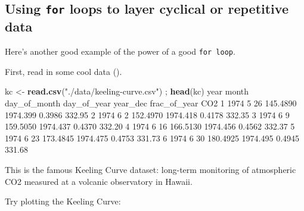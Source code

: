 \documentclass[
]{book}
\newenvironment{Shaded}{\begin{snugshade}}{\end{snugshade}}
\newcommand{\DataTypeTok}[1]{\textcolor[rgb]{0.13,0.29,0.53}{#1}}
\newcommand{\DecValTok}[1]{\textcolor[rgb]{0.00,0.00,0.81}{#1}}
\newcommand{\FloatTok}[1]{\textcolor[rgb]{0.00,0.00,0.81}{#1}}
\newcommand{\KeywordTok}[1]{\textcolor[rgb]{0.13,0.29,0.53}{\textbf{#1}}}
\newcommand{\NormalTok}[1]{#1}
\newcommand{\OperatorTok}[1]{\textcolor[rgb]{0.81,0.36,0.00}{\textbf{#1}}}
\newcommand{\StringTok}[1]{\textcolor[rgb]{0.31,0.60,0.02}{#1}}
\begin{document}
\hypertarget{using-for-loops-to-layer-cyclical-or-repetitive-data}{%
\subsection*{\texorpdfstring{Using \texttt{for} loops to layer cyclical or repetitive data}{Using for loops to layer cyclical or repetitive data}}\label{using-for-loops-to-layer-cyclical-or-repetitive-data}}

Here's another good example of the power of a good \texttt{for\ loop}.

First, read in some cool data ().

\begin{Shaded}
\begin{Highlighting}[]
\NormalTok{kc <-}\StringTok{ }\KeywordTok{read.csv}\NormalTok{(}\StringTok{"./data/keeling-curve.csv"}\NormalTok{) ; }\KeywordTok{head}\NormalTok{(kc)}
\NormalTok{  year month day_of_month day_of_year year_dec frac_of_year    CO2}
\DecValTok{1} \DecValTok{1974}     \DecValTok{5}           \DecValTok{26}    \FloatTok{145.4890} \FloatTok{1974.399}       \FloatTok{0.3986} \FloatTok{332.95}
\DecValTok{2} \DecValTok{1974}     \DecValTok{6}            \DecValTok{2}    \FloatTok{152.4970} \FloatTok{1974.418}       \FloatTok{0.4178} \FloatTok{332.35}
\DecValTok{3} \DecValTok{1974}     \DecValTok{6}            \DecValTok{9}    \FloatTok{159.5050} \FloatTok{1974.437}       \FloatTok{0.4370} \FloatTok{332.20}
\DecValTok{4} \DecValTok{1974}     \DecValTok{6}           \DecValTok{16}    \FloatTok{166.5130} \FloatTok{1974.456}       \FloatTok{0.4562} \FloatTok{332.37}
\DecValTok{5} \DecValTok{1974}     \DecValTok{6}           \DecValTok{23}    \FloatTok{173.4845} \FloatTok{1974.475}       \FloatTok{0.4753} \FloatTok{331.73}
\DecValTok{6} \DecValTok{1974}     \DecValTok{6}           \DecValTok{30}    \FloatTok{180.4925} \FloatTok{1974.495}       \FloatTok{0.4945} \FloatTok{331.68}
\end{Highlighting}
\end{Shaded}

This is the famous Keeling Curve dataset: long-term monitoring of atmospheric CO2 measured at a volcanic observatory in Hawaii.

Try plotting the Keeling Curve:

\begin{Shaded}
\end{Shaded}
\end{document}
